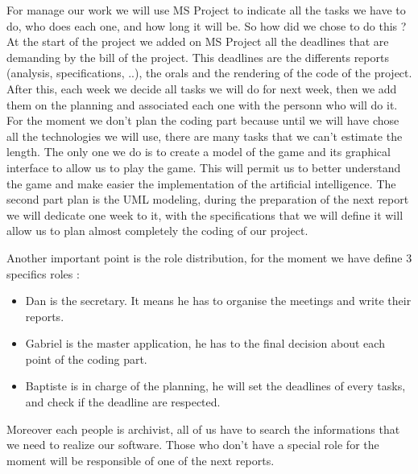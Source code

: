For manage our work we will use MS Project to indicate all the tasks we have to do, who does each one, and how long it will be.  So how did we chose to do this ?
\newline
\newline
At the start of the project we added on MS Project all the deadlines that are demanding by the bill of the project. This deadlines are the differents reports (analysis, specifications, ..), the orals and the rendering of the code of the project. After this, each week we decide all tasks we will do for next week, then we add them on the planning and associated each one with the personn who will do it.
\newline
\newline
For the moment we don't plan the coding part because until we will have chose all the technologies we will use, there are many tasks that we can't estimate the length. The only one we do is to create a model of the game and its graphical interface to allow us to play the game. This will permit us to better understand the game and make easier the implementation of the artificial intelligence.
\newline
\newline
The second part plan is the UML modeling, during the preparation of the next report we will dedicate one week to it, with the specifications that we will define it will allow us to plan almost completely the coding of our project.
\newline
\newline

Another important point is the role distribution, for the moment we have define 3 specifics roles : 
\begin{itemize}
\item  Dan is the secretary. It means he has to organise the meetings and write their reports.
\item Gabriel is the master application, he has to the final decision about each point of the coding part.
\item Baptiste is in charge of the planning, he will set the deadlines of every tasks, and check if the deadline are respected.
\end{itemize}
Moreover each people is archivist, all of us have to search the informations that we need to realize our software. Those who don't have a special role for the moment will be responsible of one of the next reports.
